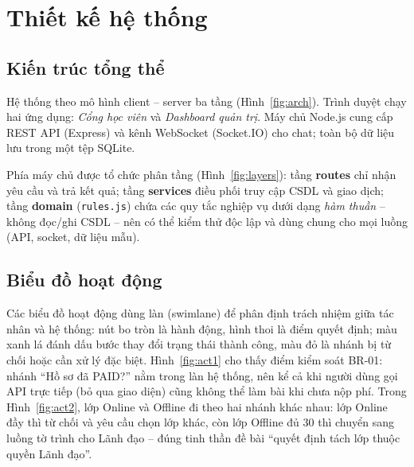 \chapter{Thiết kế hệ thống}
\label{ch:design}

\section{Kiến trúc tổng thể}
Hệ thống theo mô hình client – server ba tầng (Hình~\ref{fig:arch}). Trình duyệt chạy hai ứng dụng: \textit{Cổng học viên} và \textit{Dashboard quản trị}. Máy chủ Node.js cung cấp REST API (Express) và kênh WebSocket (Socket.IO) cho chat; toàn bộ dữ liệu lưu trong một tệp SQLite.

Phía máy chủ được tổ chức phân tầng (Hình~\ref{fig:layers}): tầng \textbf{routes} chỉ nhận yêu cầu và trả kết quả; tầng \textbf{services} điều phối truy cập CSDL và giao dịch; tầng \textbf{domain} (\texttt{rules.js}) chứa các quy tắc nghiệp vụ dưới dạng \emph{hàm thuần} – không đọc/ghi CSDL – nên có thể kiểm thử độc lập và dùng chung cho mọi luồng (API, socket, dữ liệu mẫu).

\section{Biểu đồ hoạt động}
Các biểu đồ hoạt động dùng làn (swimlane) để phân định trách nhiệm giữa tác nhân và hệ thống: nút bo tròn là hành động, hình thoi là điểm quyết định; màu xanh lá đánh dấu bước thay đổi trạng thái thành công, màu đỏ là nhánh bị từ chối hoặc cần xử lý đặc biệt.
Hình~\ref{fig:act1} cho thấy điểm kiểm soát BR-01: nhánh “Hồ sơ đã PAID?” nằm trong làn hệ thống, nên kể cả khi người dùng gọi API trực tiếp (bỏ qua giao diện) cũng không thể làm bài khi chưa nộp phí.
Trong Hình~\ref{fig:act2}, lớp Online và Offline đi theo hai nhánh khác nhau: lớp Online đầy thì từ chối và yêu cầu chọn lớp khác, còn lớp Offline đủ 30 thì chuyển sang luồng tờ trình cho Lãnh đạo – đúng tinh thần đề bài “quyết định tách lớp thuộc quyền Lãnh đạo”.

